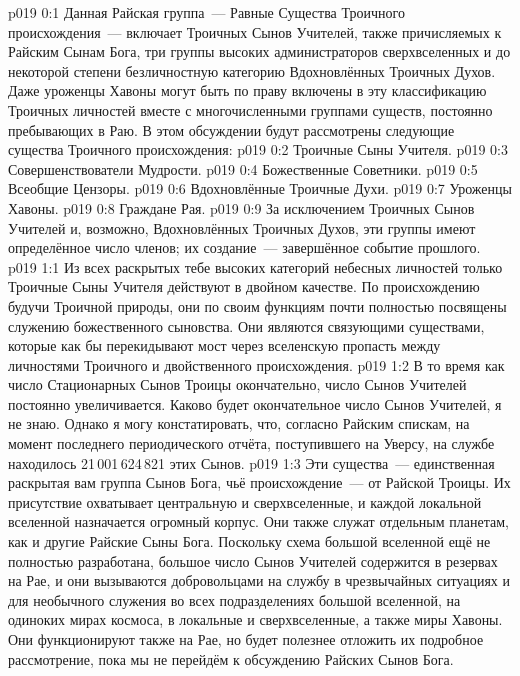 \author{Божественный Советник}
\vs p019 0:1 Данная Райская группа~--- Равные Существа Троичного происхождения~--- включает Троичных Сынов Учителей, также причисляемых к Райским Сынам Бога, три группы высоких администраторов сверхвселенных и до некоторой степени безличностную категорию Вдохновлённых Троичных Духов. Даже уроженцы Хавоны могут быть по праву включены в эту классификацию Троичных личностей вместе с многочисленными группами существ, постоянно пребывающих в Раю. В этом обсуждении будут рассмотрены следующие существа Троичного происхождения:
\vs p019 0:2  Троичные Сыны Учителя.
\vs p019 0:3  Совершенствователи Мудрости.
\vs p019 0:4  Божественные Советники.
\vs p019 0:5  Всеобщие Цензоры.
\vs p019 0:6  Вдохновлённые Троичные Духи.
\vs p019 0:7  Уроженцы Хавоны.
\vs p019 0:8  Граждане Рая.
\vs p019 0:9 \pc За исключением Троичных Сынов Учителей и, возможно, Вдохновлённых Троичных Духов, эти группы имеют определённое число членов; их создание~--- завершённое событие прошлого.
\vs p019 1:1 Из всех раскрытых тебе высоких категорий небесных личностей только Троичные Сыны Учителя действуют в двойном качестве. По происхождению будучи Троичной природы, они по своим функциям почти полностью посвящены служению божественного сыновства. Они являются связующими существами, которые как бы перекидывают мост через вселенскую пропасть между личностями Троичного и двойственного происхождения.
\vs p019 1:2 В то время как число Стационарных Сынов Троицы окончательно, число Сынов Учителей постоянно увеличивается. Каково будет окончательное число Сынов Учителей, я не знаю. Однако я могу констатировать, что, согласно Райским спискам, на момент последнего периодического отчёта, поступившего на Уверсу, на службе находилось 21\,001\,624\,821 этих Сынов.
\vs p019 1:3 Эти существа~--- единственная раскрытая вам группа Сынов Бога, чьё происхождение~--- от Райской Троицы. Их присутствие охватывает центральную и сверхвселенные, и каждой локальной вселенной назначается огромный корпус. Они также служат отдельным планетам, как и другие Райские Сыны Бога. Поскольку схема большой вселенной ещё не полностью разработана, большое число Сынов Учителей содержится в резервах на Рае, и они вызываются добровольцами на службу в чрезвычайных ситуациях и для необычного служения во всех подразделениях большой вселенной, на одиноких мирах космоса, в локальные и сверхвселенные, а также миры Хавоны. Они функционируют также на Рае, но будет полезнее отложить их подробное рассмотрение, пока мы не перейдём к обсуждению Райских Сынов Бога.

